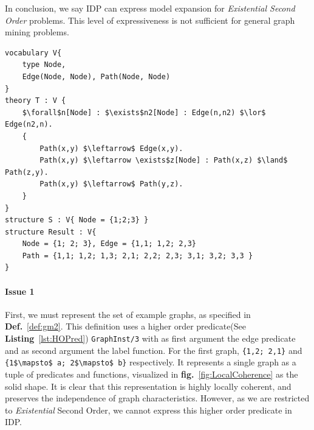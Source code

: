In conclusion, we say IDP can express model expansion for \emph{Existential Second Order} problems.
This level of expressiveness is not sufficient for general graph mining problems.


\begin{lstlisting}[mathescape,style=model,caption={IDP example using inductive definitions}, label=lst:vocabularyExample]
vocabulary V{
    type Node, 
    Edge(Node, Node), Path(Node, Node)
}
theory T : V {
    $\forall$n[Node] : $\exists$n2[Node] : Edge(n,n2) $\lor$ Edge(n2,n).
    {
        Path(x,y) $\leftarrow$ Edge(x,y).
        Path(x,y) $\leftarrow \exists$z[Node] : Path(x,z) $\land$ Path(z,y).
        Path(x,y) $\leftarrow$ Path(y,z).
    }
}
structure S : V{ Node = {1;2;3} }
structure Result : V{
    Node = {1; 2; 3}, Edge = {1,1; 1,2; 2,3}
    Path = {1,1; 1,2; 1,3; 2,1; 2,2; 2,3; 3,1; 3,2; 3,3 }
}
\end{lstlisting}


\paragraph{Issue 1}
First, we must represent the set of example graphs, as specified in \textbf{Def.}~\ref{def:gm2}. 
This definition uses a higher order predicate(See \textbf{Listing}~\ref{lst:HOPred}) \lstinline{GraphInst/3} with as first argument the edge predicate and as second argument the label function. For the first graph, \lstinline|{1,2; 2,1}| and \lstinline[mathescape]|{1$\mapsto$ a; 2$\mapsto$ b}| respectively.
It represents a single graph as a tuple of predicates and functions, visualized in \textbf{fig.}~\ref{fig:LocalCoherence} as the solid shape.
It is clear that this representation is highly locally coherent, and preserves the independence of graph characteristics.
However, as we are restricted to \emph{Existential} Second Order, we cannot express this higher order predicate in IDP.

